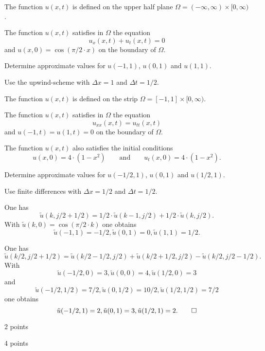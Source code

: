 \begin{teilaufgaben}
\item
{}
The function $u(x,t)$ is defined on the upper half plane
$\Omega = (-\infty,\infty) \times [0,\infty)$.

The function $u(x,t)$ satisfies in $\Omega$ the equation
\[
u_{x}(x,t) + u_{t}(x,t) = 0
\]
and  $u(x,0) = \cos(\pi/2 \cdot x)$ on the boundary of $\Omega$.

Determine approximate values for $u(-1,1)$, $u(0,1)$ and $u(1,1)$. 

Use the upwind-scheme with $\Delta x = 1$ and $\Delta t = 1/2.$

\item
{}
The function $u(x,t)$ is defined on the strip
$\Omega = [-1, 1] \times [0,\infty)$.

The function $u(x,t)$ satisfies in $\Omega$ the equation
\[
u_{xx}(x,t) = u_{tt}(x,t)
\]
and  $u(-1,t) = u(1,t) = 0$ on the boundary of $\Omega$. 

The function $u(x,t)$ also satisfies the initial conditions
\[
u(x,0) = 4 \cdot (1-x^2)
\qquad\text{and}\qquad
u_t(x,0) = 4 \cdot (1-x^2).
\]

Determine approximate values for $u(-1/2,1)$, $u(0,1)$ and $u(1/2,1)$. 

Use finite differences with $\Delta x = 1/2$ and $\Delta t = 1/2.$
\end{teilaufgaben}

\begin{loesung}
\begin{teilaufgaben}
\item
One has
\[
\tilde u(k, j/2+1/2)
=
1/2 \cdot \tilde u(k-1, j/2) + 1/2 \cdot \tilde u(k, j/2).
\]
With $\tilde u(k, 0) =  \cos(\pi/2 \cdot k)$ one obtains
\[
\tilde u(-1,1) = -1/2, \tilde u(0,1) = 0, \tilde u(1,1) = 1/2.
\]

\item
One has
\[
\tilde u(k/2, j/2+1/2)
=
\tilde u(k/2-1/2, j/2) + \tilde u(k/2+1/2, j/2) - \tilde u(k/2, j/2 - 1/2).
\]
With
\[
\tilde u(-1/2,0) = 3, \tilde u(0,0) = 4, \tilde u(1/2,0) = 3
\]
and
\[
\tilde u(-1/2,1/2) = 7/2, \tilde u(0,1/2) = 10/2, \tilde u(1/2,1/2) = 7/2
\]
one obtains
\[
\tilde u(-1/2,1) = 2, \tilde u(0,1) = 3, \tilde u(1/2,1) = 2.
\qedhere
\]
\end{teilaufgaben}
\end{loesung}

\begin{bewertung}
\begin{teilaufgaben}
\item 2 points
\item 4 points
\end{teilaufgaben}
\end{bewertung}  

